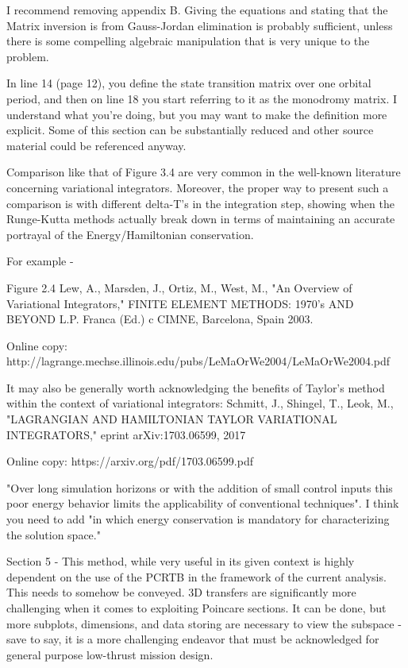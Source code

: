 \documentclass[11pt]{article}
\begin{document}
\begin{enumerate}
I recommend removing appendix B.  Giving the equations and stating that the Matrix inversion is from Gauss-Jordan elimination is probably sufficient, unless there is some compelling algebraic manipulation that is very unique to the problem.

In line 14 (page 12), you define the state transition matrix over one orbital period, and then on line 18 you start referring to it as the monodromy matrix.  I understand what you're doing, but you may want to make the definition more explicit.  Some of this section can be substantially reduced and other source material could be referenced anyway.

Comparison like that of Figure 3.4 are very common in the well-known literature concerning variational integrators.  Moreover, the proper way to present such a comparison is with different delta-T's in the integration step, showing when the Runge-Kutta methods actually break down in terms of maintaining an accurate portrayal of the Energy/Hamiltonian conservation.

For example -

Figure 2.4
Lew, A., Marsden, J., Ortiz, M., West, M., "An Overview of Variational Integrators," FINITE ELEMENT METHODS: 1970's AND BEYOND L.P. Franca (Ed.) c CIMNE, Barcelona, Spain 2003.

Online copy:
http://lagrange.mechse.illinois.edu/pubs/LeMaOrWe2004/LeMaOrWe2004.pdf

It may also be generally worth acknowledging the benefits of Taylor's method within the context of variational integrators:
Schmitt, J., Shingel, T., Leok, M., "LAGRANGIAN AND HAMILTONIAN TAYLOR VARIATIONAL INTEGRATORS," eprint arXiv:1703.06599, 2017

Online copy: https://arxiv.org/pdf/1703.06599.pdf 

"Over long simulation horizons or with the addition of small control inputs this poor energy behavior limits the applicability of conventional techniques".  I think you need to add "in which energy conservation is mandatory for characterizing the solution space."

Section 5 - This method, while very useful in its given context is highly dependent on the use of the PCRTB in the framework of the current analysis.  This needs to somehow be conveyed.  3D transfers are significantly more challenging when it comes to exploiting Poincare sections.  It can be done, but more subplots, dimensions, and data storing are necessary to view the subspace - save to say, it is a more challenging endeavor that must be acknowledged for general purpose low-thrust mission design.


\end{enumerate}
\end{document}
